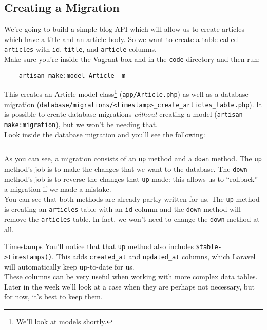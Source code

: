 \subsection{Creating a Migration}

We're going to build a simple blog API which will allow us to create articles which have a title and an article body. So we want to create a table called \texttt{articles} with \texttt{id}, \texttt{title}, and \texttt{article} columns.
\\

Make sure you're inside the Vagrant box and in the \texttt{code} directory and then run:

\begin{verbatim}
    artisan make:model Article -m
\end{verbatim}

This creates an Article model class\footnote{We'll look at models shortly.} (\texttt{app/Article.php}) as well as a database migration (\texttt{database/migrations/<timestamp>\_create\_articles\_table.php}). It is possible to create database migrations \textit{without} creating a model (\texttt{artisan make:migration}), but we won't be needing that.
\\

Look inside the database migration and you'll see the following:

\inputminted{php}{03/figures/02/01-migration.php}

As you can see, a migration consists of an \texttt{up} method and a \texttt{down} method. The \texttt{up} method's job is to make the changes that we want to the database. The \texttt{down} method's job is to reverse the changes that \texttt{up} made: this allows us to ``rollback'' a migration if we made a mistake.
\\

You can see that both methods are already partly written for us. The \texttt{up} method is creating an \texttt{articles} table with an \texttt{id} column and the \texttt{down} method will remove the \texttt{articles} table. In fact, we won't need to change the \texttt{down} method at all.

\begin{infobox}{Timestamps}
    You'll notice that that \texttt{up} method also includes \texttt{\$table->timestamps()}. This adds \texttt{created\_at} and \texttt{updated\_at} columns, which Laravel will automatically keep up-to-date for us.
    \\

    These columns can be very useful when working with more complex data tables. Later in the week we'll look at a case when they are perhaps not necessary, but for now, it's best to keep them.
\end{infobox}

